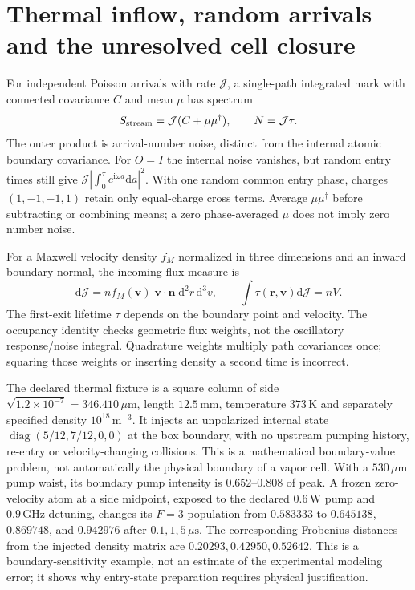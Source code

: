 \documentclass[11pt,a4paper]{article}
\newcommand{\dd}{\mathrm d}
\newcommand{\ii}{\mathrm i}
\newcommand{\GHz}{\,\mathrm{GHz}}
\begin{document}
\section{Thermal inflow, random arrivals and the unresolved cell closure}
\label{sec:gc-ensemble}

For independent Poisson arrivals with rate $\mathcal J$, a single-path
integrated mark with connected covariance $C$ and mean $\mu$ has spectrum
\begin{equation}
 S_{\rm stream}=\mathcal J(C+\mu\mu^\dagger),\qquad
 \overline N=\mathcal J\tau.
 \label{eq:gc-arrival-noise}
\end{equation}
The outer product is arrival-number noise, distinct from the internal atomic
boundary covariance. For $O=I$ the internal noise vanishes, but random entry
times still give $\mathcal J|\int_0^\tau e^{\ii\omega a}\dd a|^2$.
With one random common entry phase, charges $(1,-1,-1,1)$ retain only
equal-charge cross terms. Average $\mu\mu^\dagger$ before subtracting or
combining means; a zero phase-averaged $\mu$ does not imply zero number noise.

For a Maxwell velocity density $f_M$ normalized in three dimensions and an
inward boundary normal, the incoming flux measure is
\begin{equation}
 \dd\mathcal J=n f_M(\mathbf v)|\mathbf v\cdot\mathbf n|
   \dd^2r\,\dd^3v,\qquad
 \int\tau(\mathbf r,\mathbf v)\dd\mathcal J=nV.
 \label{eq:gc-thermal-flux}
\end{equation}
The first-exit lifetime $\tau$ depends on the boundary point and velocity.
The occupancy identity checks geometric flux weights, not the oscillatory
response/noise integral. Quadrature weights multiply path covariances once;
squaring those weights or inserting density a second time is incorrect.

The declared thermal fixture is a square column of side
$\sqrt{1.2\times10^{-7}}=346.410\,\mu\mathrm m$, length $12.5\,\mathrm{mm}$,
temperature $373\,\mathrm K$ and separately specified density
$10^{18}\,\mathrm{m}^{-3}$. It injects an unpolarized internal state
$\operatorname{diag}(5/12,7/12,0,0)$ at the box boundary, with no upstream
pumping history, re-entry or velocity-changing collisions. This is a
mathematical boundary-value problem, not automatically the physical boundary
of a vapor cell. With a $530\,\mu\mathrm m$ pump waist, its boundary pump
intensity is $0.652$--$0.808$ of peak. A frozen zero-velocity atom at a side
midpoint, exposed to the declared $0.6\,\mathrm W$ pump and $0.9\GHz$
detuning, changes its $F=3$ population from $0.583333$ to $0.645138$,
$0.869748$, and $0.942976$ after $0.1,1,5\,\mu\mathrm s$. The corresponding
Frobenius distances from the injected density matrix are $0.20293,0.42950,
0.52642$. This is a boundary-sensitivity example, not an estimate of the
experimental modeling error; it shows why entry-state preparation requires
physical justification.
\end{document}
